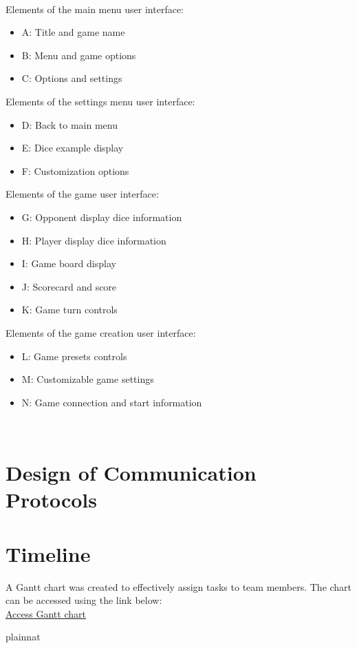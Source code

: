 \documentclass[12pt, titlepage]{article}
\begin{document}
~
\newpage
~
\newpage

\noindent
Elements of the main menu user interface:
\begin{itemize}
  \item A: Title and game name
  \item B: Menu and game options
  \item C: Options and settings
\end{itemize}
Elements of the settings menu user interface:
\begin{itemize}
  \item D: Back to main menu
  \item E: Dice example display
  \item F: Customization options
\end{itemize}
Elements of the game user interface:
\begin{itemize}
  \item G: Opponent display dice information
  \item H: Player display dice information
  \item I: Game board display
  \item J: Scorecard and score
  \item K: Game turn controls
\end{itemize}
Elements of the game creation user interface:
\begin{itemize}
  \item L: Game presets controls
  \item M: Customizable game settings
  \item N: Game connection and start information
\end{itemize}









~\newpage
\section{Design of Communication Protocols}


\section{Timeline}

A Gantt chart was created to effectively assign tasks to team members. The chart can be accessed using the link below:\\

\href{https://mcmasteru365-my.sharepoint.com/:x:/r/personal/bhatth14_mcmaster_ca/Documents/Rev0%20Gnatt%20Chart.xlsx?d=w7c7c84af07004c328dc311a8721a5adb&csf=1&web=1&e=d8G3hJ}{Access Gantt chart}

 {plainnat}


\newpage{}
\end{document}
